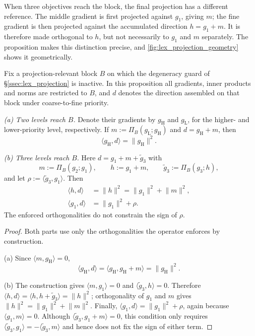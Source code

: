 When three objectives reach the block, the final projection has a different
reference. The middle gradient is first projected against $g_1$, giving $m$;
the fine gradient is then projected against the accumulated direction
$h=g_1+m$. It is therefore made orthogonal to $h$, but not necessarily to $g_1$
and $m$ separately. The proposition makes this distinction precise, and
\cref{fig:lex_projection_geometry} shows it geometrically.

\begin{proposition}
\label{prop:lex_firstorder}
Fix a projection-relevant block $B$ on which the degeneracy guard of
\S\ref{ssec:lex_projection} is inactive. In this proposition all gradients,
inner products and norms are restricted to $B$, and $d$ denotes the direction
assembled on that block under coarse-to-fine priority.

\medskip
\noindent\emph{(a) Two levels reach $B$.} Denote their gradients by
$g_{\mathrm{H}}$ and $g_{\mathrm{L}}$, for the higher- and lower-priority level,
respectively. If
$m:=\Pi_B(g_{\mathrm{L}};g_{\mathrm{H}})$ and
$d=g_{\mathrm{H}}+m$, then
\[
\langle g_{\mathrm{H}},d\rangle
  =\lVert g_{\mathrm{H}}\rVert^{2}.
\]

\medskip
\noindent\emph{(b) Three levels reach $B$.} Here $d=g_1+m+\tilde g_3$ with
\[
m:=\Pi_B(g_2;g_1),
\qquad
h:=g_1+m,
\qquad
\tilde g_3:=\Pi_B(g_3;h),
\]
and let $\rho:=\langle\tilde g_3,g_1\rangle$. Then
\[
\begin{aligned}
\langle h,d\rangle   &=\lVert h\rVert^2
                       =\lVert g_1\rVert^{2}+\lVert m\rVert^{2},\\[0.4ex]
\langle g_1,d\rangle &=\lVert g_1\rVert^{2}+\rho.
\end{aligned}
\]
The enforced orthogonalities do not constrain the sign of $\rho$.
\end{proposition}
\begin{proof}
Both parts use only the orthogonalities the operator enforces by construction.

(a) Since $\langle m,g_{\mathrm{H}}\rangle=0$,
\[
\langle g_{\mathrm{H}},d\rangle
=\langle g_{\mathrm{H}},g_{\mathrm{H}}+m\rangle
=\lVert g_{\mathrm{H}}\rVert^2.
\]

(b) The construction gives $\langle m,g_1\rangle=0$ and
$\langle\tilde g_3,h\rangle=0$. Therefore
$\langle h,d\rangle=\langle h,h+\tilde g_3\rangle=\lVert h\rVert^2$;
orthogonality of $g_1$ and $m$ gives
$\lVert h\rVert^2=\lVert g_1\rVert^2+\lVert m\rVert^2$. Finally,
$\langle g_1,d\rangle=\lVert g_1\rVert^2+\rho$, again because
$\langle g_1,m\rangle=0$. Although
$\langle\tilde g_3,g_1+m\rangle=0$, this condition only requires
$\langle\tilde g_3,g_1\rangle=-\langle\tilde g_3,m\rangle$ and hence does not
fix the sign of either term.
\end{proof}

